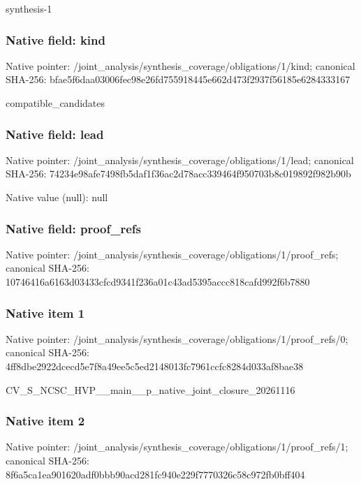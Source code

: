 \documentclass[10pt,a4paper]{article}
\begin{document}
\begingroup\raggedright\sloppy synthesis-1\par\endgroup

\subsubsection{Native field: kind}
Native pointer: /joint\_\allowbreak{}analysis/synthesis\_\allowbreak{}coverage/obligations/1/kind; canonical SHA-256: bfae5f6daa03006fec98e26fd755918445e662d473f2937f56185e6284333167

\begingroup\raggedright\sloppy compatible\_\allowbreak{}candidates\par\endgroup

\subsubsection{Native field: lead}
Native pointer: /joint\_\allowbreak{}analysis/synthesis\_\allowbreak{}coverage/obligations/1/lead; canonical SHA-256: 74234e98afe7498fb5daf1f36ac2d78acc339464f950703b8c019892f982b90b

Native value (null): null

\subsubsection{Native field: proof\_\allowbreak{}refs}
Native pointer: /joint\_\allowbreak{}analysis/synthesis\_\allowbreak{}coverage/obligations/1/proof\_\allowbreak{}refs; canonical SHA-256: 10746416a6163d03433cfcd9341f236a01c43ad5395accc818cafd992f6b7880

\subsubsection{Native item 1}
Native pointer: /joint\_\allowbreak{}analysis/synthesis\_\allowbreak{}coverage/obligations/1/proof\_\allowbreak{}refs/0; canonical SHA-256: 4ff8dbe2922dcecd5e7f8a49ee5c5ed2148013fc7961ccfc8284d033af8bae38

\begingroup\raggedright\sloppy CV\_\allowbreak{}S\_\allowbreak{}NCSC\_\allowbreak{}HVP\_\allowbreak{}\_\allowbreak{}main\_\allowbreak{}\_\allowbreak{}p\_\allowbreak{}native\_\allowbreak{}joint\_\allowbreak{}closure\_\allowbreak{}20261116\par\endgroup

\subsubsection{Native item 2}
Native pointer: /joint\_\allowbreak{}analysis/synthesis\_\allowbreak{}coverage/obligations/1/proof\_\allowbreak{}refs/1; canonical SHA-256: 8f6a5ca1ea901620adf0bbb90acd281fc940e229f7770326c58c972fb0bff404
\end{document}
